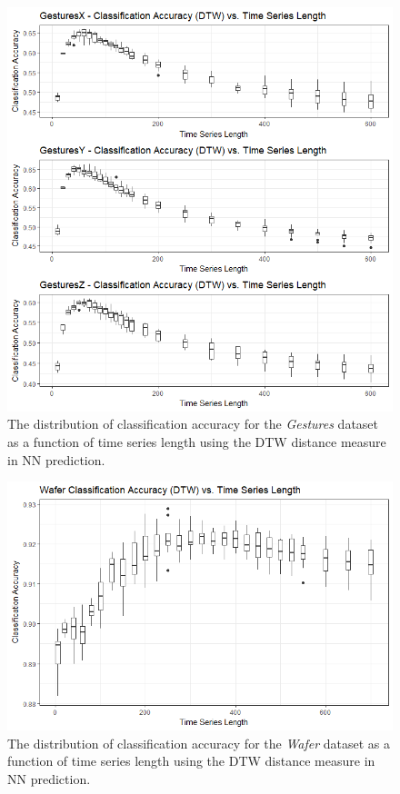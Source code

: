 \documentclass[10pt,a4paper]{article}
\begin{document}
\begin{figure}[H]
\begin{center}
	\includegraphics[width=1\textwidth]{Images/GesturesAccuracyVsLengthDTW_box.png}
	\caption{The distribution of classification accuracy for the \textit{Gestures} dataset as a function of time series length using the DTW distance measure in NN prediction.}
\end{center}
\end{figure}

\begin{figure}[H]
\begin{center}
	\includegraphics[width=1\textwidth]{Images/WaferAccuracyVsLengthDTW_box.png}
	\caption{The distribution of classification accuracy for the \textit{Wafer} dataset as a function of time series length using the DTW distance measure in NN prediction.}
\end{center}
\end{figure}
\end{document}

